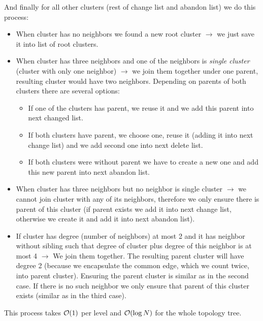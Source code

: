 And finally for all other clusters (rest of change list and abandon list) we do
this process:
\begin{itemize}

\item {\I When cluster has no neighbors we found a new root cluster}
$\rightarrow$ we just save it into list of root clusters.

\item {\I When cluster has three neighbors and one of the neighbors is {\sl single
cluster} (cluster with only one neighbor)} $\rightarrow$ we join them together
under one parent, resulting cluster would have two neighbors. Depending on parents
of both clusters there are several options:
	\begin{itemize}
	\item If one of the clusters has parent, we reuse it and we add this parent
	into next changed list.
	\item If both clusters have parent, we choose one, reuse it (adding it
	into next change list) and we add second one into next delete list.
	\item If both clusters were without parent we have to create a new one
	and add this new parent into next abandon list.
	\end{itemize}

\item {\I When cluster has three neighbors but no neighbor is single cluster}
$\rightarrow$ we cannot join cluster with any of its neighbors, therefore we
only ensure there is parent of this cluster (if parent exists we add it into
next change list, otherwise we create it and add it into next abandon list).

\item {\I If cluster has degree (number of neighbors) at most 2 and it has
neighbor without sibling such that degree of cluster plus degree of this
neighbor is at most 4} $\rightarrow$ We join them together. The resulting parent cluster
will have degree 2 (because we encapsulate the common edge, which we count
twice, into parent cluster). Ensuring the parent cluster is similar as in the
second case. If there is no such neighbor we only ensure that parent of this cluster exists
(similar as in the third case).

\end{itemize}

This process takes ${\cal O}(1)$ per level and ${\cal O}(\log N)$ for the whole topology tree.


